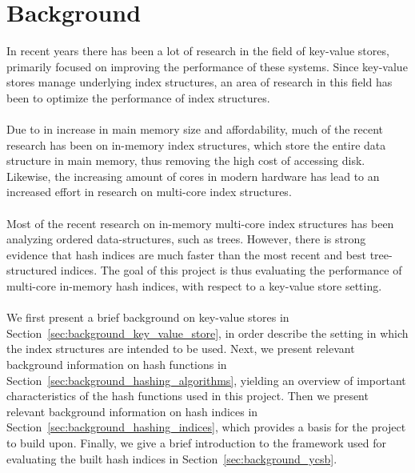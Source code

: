 \documentclass[11pt]{report} %
\begin{document}
\chapter{Background}
\label{chap:background}
In recent years there has been a lot of research in the field of key-value stores, primarily focused on improving the performance of these systems. Since key-value stores manage underlying index structures, an area of research in this field has been to optimize the performance of index structures. \\
\\
Due to in increase in main memory size and affordability, much of the recent research has been on in-memory index structures, which store the entire data structure in main memory, thus removing the high cost of accessing disk. Likewise, the increasing amount of cores in modern hardware has lead to an increased effort in research on multi-core index structures. \\
\\
Most of the recent research on in-memory multi-core index structures has been analyzing ordered data-structures, such as trees. However, there is strong evidence that hash indices are much faster than the most recent and best tree-structured indices. The goal of this project is thus evaluating the performance of multi-core in-memory hash indices, with respect to a key-value store setting. \\
\\
We first present a brief background on key-value stores in Section~\ref{sec:background_key_value_store}, in order describe the setting in which the index structures are intended to be used. Next, we present relevant background information on hash functions in Section~\ref{sec:background_hashing_algorithms}, yielding an overview of important characteristics of the hash functions used in this project. Then we present relevant background information on hash indices in Section~\ref{sec:background_hashing_indices}, which provides a basis for the project to build upon. Finally, we give a brief introduction to the framework used for evaluating the built hash indices in Section~\ref{sec:background_ycsb}.
\end{document}
